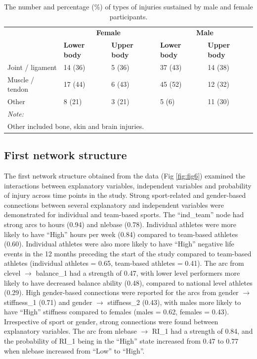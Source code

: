 \documentclass[
  english,
  man,floatsintext]{apa6}
\begin{document}
\begin{table}[H]

\caption{\label{tab:table4}The number and percentage (\%) of types of injuries sustained by male and female participants.}
\centering
\begin{tabular}[t]{l|l|l|l|l}
\hline
\multicolumn{1}{c|}{\textbf{ }} & \multicolumn{2}{c|}{\textbf{Female}} & \multicolumn{2}{c}{\textbf{Male}} \\
\cline{2-3} \cline{4-5}
\textbf{} & \textbf{Lower body} & \textbf{Upper body} & \textbf{Lower body} & \textbf{Upper body}\\
\hline
Joint / ligament & 14 (36) & 5 (36) & 37 (43) & 14 (38)\\
\hline
Muscle / tendon & 17 (44) & 6 (43) & 45 (52) & 12 (32)\\
\hline
Other & 8 (21) & 3 (21) & 5 (6) & 11 (30)\\
\hline
\multicolumn{5}{l}{\textit{Note: }}\\
\multicolumn{5}{l}{Other included bone, skin and brain injuries.}\\
\end{tabular}
\end{table}

\hypertarget{first-network-structure}{%
\subsection{First network structure}\label{first-network-structure}}

The first network structure obtained from the data (Fig \ref{fig:fig6}) examined the interactions between explanatory variables, independent variables and probability of injury across time points in the study.
Strong sport-related and gender-based connections between several explanatory and independent variables were demonstrated for individual and team-based sports.
The ``ind\_team'' node had strong arcs to hours (0.94) and nlebase (0.78).
Individual athletes were more likely to have ``High'' hours per week (0.84) compared to team-based athletes (0.60).
Individual athletes were also more likely to have ``High'' negative life events in the 12 months preceding the start of the study compared to team-based athletes (individual athletes = 0.65, team-based athletes = 0.41).
The arc from clevel \(\rightarrow\) balance\_1 had a strength of 0.47, with lower level performers more likely to have decreased balance ability (0.48), compared to national level athletes (0.29).
High gender-based connections were reported for the arcs from gender \(\rightarrow\) stiffness\_1 (0.71) and gender \(\rightarrow\) stiffness\_2 (0.43), with males more likely to have ``High'' stiffness compared to females (males = 0.62, females = 0.43).
Irrespective of sport or gender, strong connections were found between explanatory variables. The arc from nlebase \(\rightarrow\) RI\_1 had a strength of 0.84, and the probability of RI\_1 being in the ``High'' state increased from 0.47 to 0.77 when nlebase increased from ``Low'' to ``High''.
\end{document}

